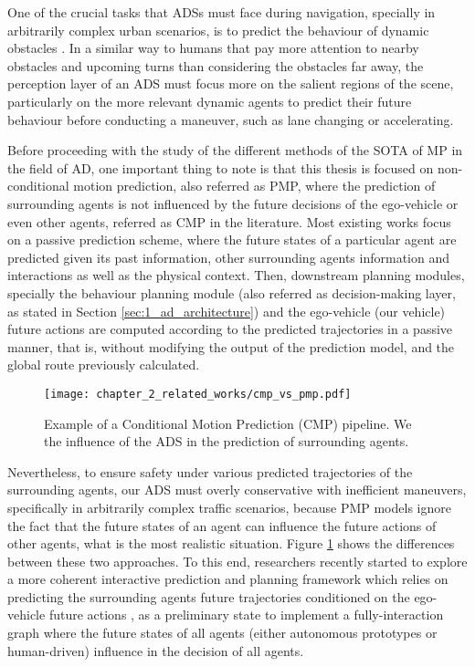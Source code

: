 One of the crucial tasks that \acp{ADS} must face during navigation, specially in arbitrarily complex urban scenarios, is to predict the behaviour of dynamic obstacles \cite{chang2019argoverse, salzmann2020trajectron++}. In a similar way to humans that pay more attention to nearby obstacles and upcoming turns than considering the obstacles far away, the perception layer of an \ac{ADS} must focus more on the salient regions of the scene, particularly on the more relevant dynamic agents to predict their future behaviour before conducting a maneuver, such as lane changing or accelerating. 

Before proceeding with the study of the different methods of the \ac{SOTA} of \ac{MP} in the field of \ac{AD}, one important thing to note is that this thesis is focused on non-conditional motion prediction, also referred as \ac{PMP}, where the prediction of surrounding agents is not influenced by the future decisions of the ego-vehicle or even other agents, referred as \ac{CMP} in the literature. Most existing works \cite{gilles2021home, gilles2022gohome, varadarajan2022multipath++, wang2022ganet, schmidt2022crat, liang2020learning} focus on a passive prediction scheme, where the future states of a particular agent are predicted given its past information, other surrounding agents information and interactions as well as the physical context. Then, downstream planning modules, specially the behaviour planning module (also referred as decision-making layer, as stated in Section \ref{sec:1_ad_architecture}) and the ego-vehicle (our vehicle) future actions are computed according to the predicted trajectories in a passive manner, that is, without modifying the output of the prediction model, and the global route previously calculated. 

\begin{figure}[h]
	\centering
	\texttt{[image: chapter\_2\_related\_works/cmp\_vs\_pmp.pdf]}
	\caption[Example of a Conditional Motion Prediction (CMP) pipeline]{Example of a Conditional Motion Prediction (CMP) pipeline. We \textbf{\color{red}{highlight}} the influence of the \ac{ADS} in the prediction of surrounding agents.}
	\label{fig:chapter_2_related_works/cmp_vs_pmp}
\end{figure}

Nevertheless, to ensure safety under various predicted trajectories of the surrounding agents, our \ac{ADS} must overly conservative with inefficient maneuvers, specifically in arbitrarily complex traffic scenarios, because \ac{PMP} models ignore the fact that the future states of an agent can influence the future actions of other agents, what is the most realistic situation. Figure \ref{fig:chapter_2_related_works/cmp_vs_pmp} shows the differences between these two approaches. To this end, researchers recently started to explore a more coherent interactive prediction and planning framework which relies on predicting the surrounding agents future trajectories conditioned on the ego-vehicle future actions \cite{tang2019multiple} \cite{rhinehart2019precog} \cite{khandelwal2020if}, as a preliminary state to implement a fully-interaction graph where the future states of all agents (either autonomous prototypes or human-driven) influence in the decision of all agents. 

